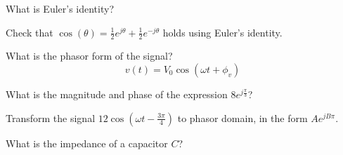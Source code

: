 
\begin{enumerate}


\qitem What is Euler's identity?

\ws{\vspace{30px}}


\qitem Check that $\cos(\theta)=\frac{1}{2}e^{j\theta}+\frac{1}{2}e^{-j\theta}$ holds using Euler's identity.

\ws{\vspace{30px}}



\qitem What is the phasor form of the signal?
\begin{equation}
v(t) = V_0 \cos(\omega t + \phi_v) \end{equation}
\ws{\vspace{30px}}


\qitem What is the magnitude and phase of the expression $8 e^{j \frac{\pi}{3}}$?

\ws{\vspace{30px}}



\qitem Transform the signal $12 \cos(\omega t - \frac{3\pi}{4})$ to phasor domain, in the form $A e^{jB\pi}$.

\ws{\vspace{30px}}



\qitem What is the impedance of a capacitor $C$?

\ws{\vspace{30px}}





\end{enumerate}
